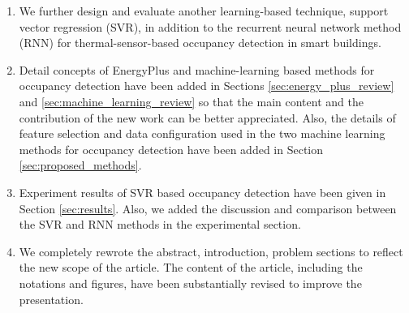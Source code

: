 \begin{enumerate}
\item We further design and evaluate another learning-based technique,
    support vector regression (SVR), in addition to the recurrent neural network method (RNN)
    for thermal-sensor-based occupancy detection in smart buildings.  

\item Detail concepts of EnergyPlus and machine-learning based methods for occupancy 
detection have been added in Sections \ref{sec:energy_plus_review} and \ref{sec:machine_learning_review} so that the main content and the contribution of
  the new work can be better appreciated. Also, the details of feature selection 
and data configuration used in the two machine learning methods for occupancy detection have been added in Section \ref{sec:proposed_methods}. 

\item Experiment results of SVR based occupancy detection have been given in Section \ref{sec:results}.
Also, we added the discussion and comparison between the SVR and RNN methods in the experimental section.
    
\item We completely rewrote the abstract, introduction, problem
sections to reflect the new scope of the article. The content of the article, including the notations and figures,
have been substantially revised to improve the presentation.






  





%
%
%
%
%
%


\end{enumerate}



%
